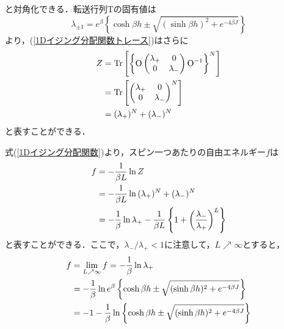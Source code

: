 \documentclass[a4paper,11pt]{jsreport}
\begin{document}
と対角化できる．転送行列$\mathrm{T}$の固有値は
\begin{equation}
  \lambda_{\pm{1}}
  = e^{\beta} \left\{ \cosh{\beta h} \pm{\sqrt{(\sinh{\beta h})^2 + e^{-4\beta J}}} \right\}
\end{equation}
より，(\ref{1Dイジング分配関数トレース})はさらに
\begin{align}
  Z
   & = \mathrm{Tr} \left[ \left\{ \mathrm{O}
  \begin{pmatrix}
      \lambda_{+} & 0           \\
      0           & \lambda_{-}
    \end{pmatrix} \mathrm{O}^{-1} \right\}^N \right] \notag   \\
   & = \mathrm{Tr} \left[
  \begin{pmatrix}
      \lambda_{+} & 0           \\
      0           & \lambda_{-}
    \end{pmatrix}^N \right] \notag                            \\
   & = (\lambda_{+})^N + (\lambda_{-})^N \label{1Dイジング分配関数}
\end{align}
と表すことができる．\par
式(\ref{1Dイジング分配関数})より，スピン一つあたりの自由エネルギー$f$は
\begin{align}
  f
   & = -\frac{1}{\beta L} \ln{Z} \notag                                                                                              \\
   & = -\frac{1}{\beta L} \ln{(\lambda_{+})^N + (\lambda_{-})^N} \notag                                                              \\
   & = -\frac{1}{\beta} \ln{\lambda_{+}} - \frac{1}{\beta L} \left\{ 1 + \left( \frac{\lambda_{-}}{\lambda_{+}} \right)^{L} \right\}
\end{align}
と表すことができる．ここで，$\lambda_{-}/\lambda_{+}<1$に注意して，$L \nearrow \infty$とすると，
\begin{align}
  f
   & = \lim_{L \nearrow \infty} f = -\frac{1}{\beta} \ln{\lambda_{+}} \notag                                                   \\
   & = -\frac{1}{\beta} \ln{e^{\beta} \left\{ \cosh{\beta h} \pm{\sqrt{(\sinh{\beta h})^2 + e^{-4\beta J}}}\right\}} \notag    \\
   & = -1 -\frac{1}{\beta} \ln{\left\{\cosh{\beta h} \pm{\sqrt{(\sinh{\beta h})^2 + e^{-4\beta J}}}\right\}} \label{1D自由エネルギー}
\end{align}
\end{document}
